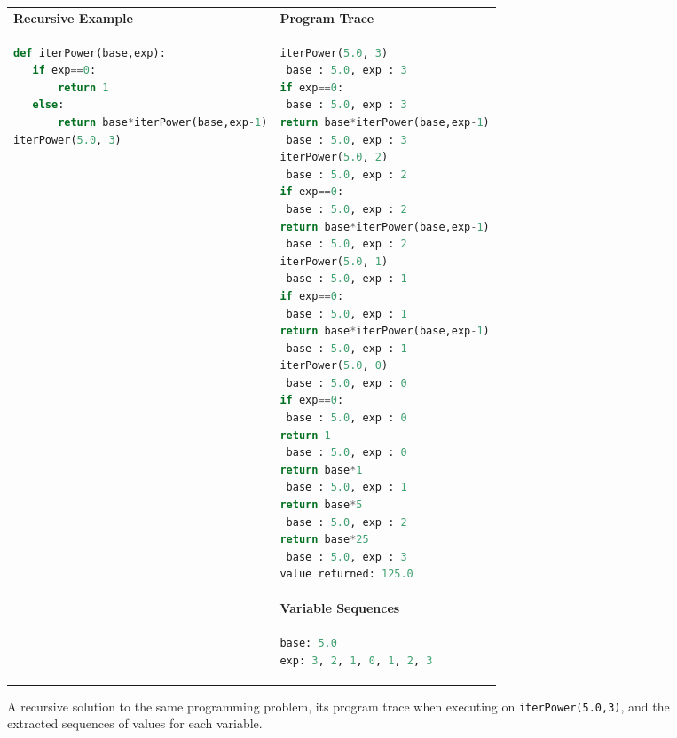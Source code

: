 \documentclass[12pt,twoside]{mitthesis}
\begin{document}
\begin{figure}
\begin{tabular}{ll}
{\bf Recursive Example} & {\bf Program Trace} \\
\begin{minipage}{0.5\linewidth}
\begin{lstlisting}[basicstyle=\linespread{1.0}\ttfamily\footnotesize,language=python]
def iterPower(base,exp):
   if exp==0:
       return 1
   else:
       return base*iterPower(base,exp-1)
iterPower(5.0, 3)
\end{lstlisting}
\end{minipage} &
\begin{minipage}{0.4\linewidth}
\begin{lstlisting}[basicstyle=\linespread{1.0}\ttfamily\footnotesize,language=python,linebackgroundcolor={\lstcolorlines[gray!20]{2,4,6,8,10,12,14,16,18,20,22,24,26,28,30}}]
iterPower(5.0, 3)
 base : 5.0, exp : 3
if exp==0:
 base : 5.0, exp : 3 
return base*iterPower(base,exp-1)
 base : 5.0, exp : 3 
iterPower(5.0, 2)
 base : 5.0, exp : 2
if exp==0: 
 base : 5.0, exp : 2 
return base*iterPower(base,exp-1)
 base : 5.0, exp : 2
iterPower(5.0, 1)
 base : 5.0, exp : 1
if exp==0:
 base : 5.0, exp : 1
return base*iterPower(base,exp-1)
 base : 5.0, exp : 1
iterPower(5.0, 0)
 base : 5.0, exp : 0
if exp==0:
 base : 5.0, exp : 0
return 1
 base : 5.0, exp : 0
return base*1
 base : 5.0, exp : 1
return base*5
 base : 5.0, exp : 2
return base*25
 base : 5.0, exp : 3
value returned: 125.0
\end{lstlisting}
\end{minipage} 
\\
& {\bf Variable Sequences} \\
&
\begin{minipage}{0.5\linewidth}
\begin{lstlisting}[language=python]
base: 5.0
exp: 3, 2, 1, 0, 1, 2, 3
\end{lstlisting}
\end{minipage}
\end{tabular}
\caption{A recursive solution to the same programming problem, its program trace when executing on \texttt{iterPower(5.0,3)}, and the extracted sequences of values for each variable.}
\label{fig:recursiveTrace}
\end{figure}
\end{document}

